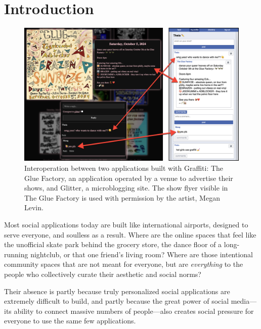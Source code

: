 \section{Introduction}

\begin{figure}[h]
    \centering
    \includegraphics[width=\textwidth]{paper/figures/gloof-and-glitter.jpg}
    \caption{
    Interoperation between two applications built with Graffiti:
    The Glue Factory, an application operated by a venue to advertise their shows,
    and Glitter, a microblogging site.
    The show flyer visible in The Glue Factory is used with permission by the artist, Megan Levin.
    }
    \label{case-studies:fig:gloof-and-glitter}
\end{figure}

Most social applications today are built like international airports,
designed to serve everyone, and soulless as a result.
Where are the online spaces that feel like
the unofficial skate park behind the grocery store,
the dance floor of a long-running nightclub,
or that one friend's living room?
Where are those intentional community spaces that
are not meant for everyone,
but are \emph{everything} to the people
who collectively curate their aesthetic and social norms?

Their absence is partly because truly personalized social applications
are extremely difficult to build,
and partly because the great power of social media---its
ability to connect massive numbers of people---also
creates social pressure for everyone to use the same few applications.

